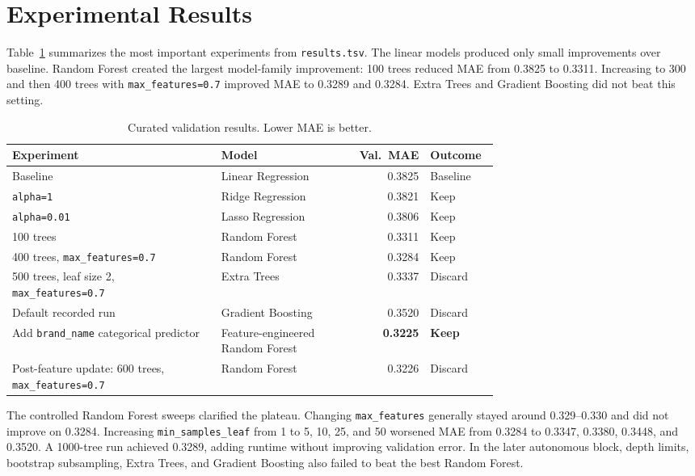 \section{Experimental Results}

Table~\ref{tab:results} summarizes the most important experiments from \texttt{results.tsv}. The linear models produced only small improvements over baseline. Random Forest created the largest model-family improvement: 100 trees reduced MAE from 0.3825 to 0.3311. Increasing to 300 and then 400 trees with \texttt{max\_features=0.7} improved MAE to 0.3289 and 0.3284. Extra Trees and Gradient Boosting did not beat this setting.

\begin{table}[h]
\centering
\footnotesize
\caption{Curated validation results. Lower MAE is better.}
\label{tab:results}
\begin{tabular}{p{0.43\linewidth} p{0.27\linewidth} r l}
\hline
Experiment & Model & Val.\ MAE & Outcome \\
\hline
Baseline & Linear Regression & 0.3825 & Baseline \\
\texttt{alpha=1} & Ridge Regression & 0.3821 & Keep \\
\texttt{alpha=0.01} & Lasso Regression & 0.3806 & Keep \\
100 trees & Random Forest & 0.3311 & Keep \\
400 trees, \texttt{max\_features=0.7} & Random Forest & 0.3284 & Keep \\
500 trees, leaf size 2, \texttt{max\_features=0.7} & Extra Trees & 0.3337 & Discard \\
Default recorded run & Gradient Boosting & 0.3520 & Discard \\
Add \texttt{brand\_name} categorical predictor & Feature-engineered Random Forest & \textbf{0.3225} & \textbf{Keep} \\
Post-feature update: 600 trees, \texttt{max\_features=0.7} & Random Forest & 0.3226 & Discard \\
\hline
\end{tabular}
\end{table}

The controlled Random Forest sweeps clarified the plateau. Changing \texttt{max\_features} generally stayed around 0.329--0.330 and did not improve on 0.3284. Increasing \texttt{min\_samples\_leaf} from 1 to 5, 10, 25, and 50 worsened MAE from 0.3284 to 0.3347, 0.3380, 0.3448, and 0.3520. A 1000-tree run achieved 0.3289, adding runtime without improving validation error. In the later autonomous block, depth limits, bootstrap subsampling, Extra Trees, and Gradient Boosting also failed to beat the best Random Forest.

